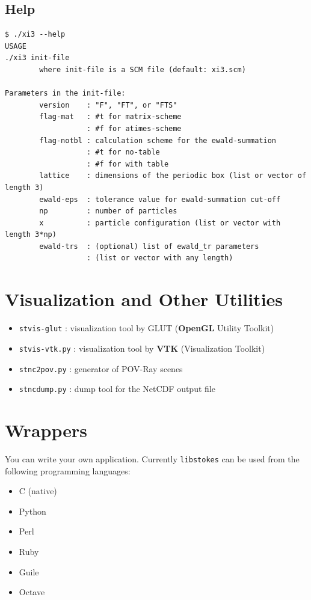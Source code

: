 \documentclass{book}
\begin{document}
\subsection{Help}
{\small
\begin{verbatim}
$ ./xi3 --help
USAGE
./xi3 init-file
        where init-file is a SCM file (default: xi3.scm)

Parameters in the init-file:
        version    : "F", "FT", or "FTS"
        flag-mat   : #t for matrix-scheme
                   : #f for atimes-scheme
        flag-notbl : calculation scheme for the ewald-summation
                   : #t for no-table
                   : #f for with table
        lattice    : dimensions of the periodic box (list or vector of length 3)
        ewald-eps  : tolerance value for ewald-summation cut-off
        np         : number of particles
        x          : particle configuration (list or vector with length 3*np)
        ewald-trs  : (optional) list of ewald_tr parameters
                   : (list or vector with any length)
\end{verbatim}
}


\section{Visualization and Other Utilities}
\begin{itemize}
\item {\tt stvis-glut} : visualization tool by
  GLUT ({\bf OpenGL} Utility Toolkit)\cite{OpenGL}
\item {\tt stvis-vtk.py} : visualization tool by
  {\bf VTK} (Visualization Toolkit)\cite{VTK}
\item {\tt stnc2pov.py} : generator of POV-Ray scenes
\item {\tt stncdump.py} : dump tool for the NetCDF output file
\end{itemize}


\section{Wrappers}
You can write your own application.
Currently {\tt libstokes} can be used from the following programming languages:
\begin{itemize}
\item C (native)
\item Python
\item Perl
\item Ruby
\item Guile
\item Octave
\end{itemize}
\end{document}
